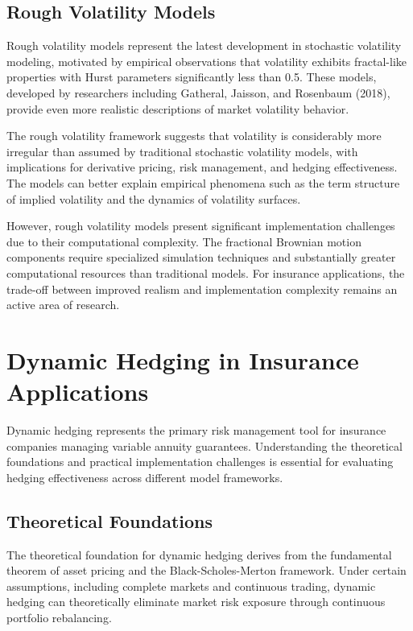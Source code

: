 \documentclass[12pt,a4paper]{report}
\begin{document}
\subsection{Rough Volatility Models}

Rough volatility models represent the latest development in stochastic volatility modeling, motivated by empirical observations that volatility exhibits fractal-like properties with Hurst parameters significantly less than 0.5. These models, developed by researchers including Gatheral, Jaisson, and Rosenbaum (2018), provide even more realistic descriptions of market volatility behavior.

The rough volatility framework suggests that volatility is considerably more irregular than assumed by traditional stochastic volatility models, with implications for derivative pricing, risk management, and hedging effectiveness. The models can better explain empirical phenomena such as the term structure of implied volatility and the dynamics of volatility surfaces.

However, rough volatility models present significant implementation challenges due to their computational complexity. The fractional Brownian motion components require specialized simulation techniques and substantially greater computational resources than traditional models. For insurance applications, the trade-off between improved realism and implementation complexity remains an active area of research.

\section{Dynamic Hedging in Insurance Applications}

Dynamic hedging represents the primary risk management tool for insurance companies managing variable annuity guarantees. Understanding the theoretical foundations and practical implementation challenges is essential for evaluating hedging effectiveness across different model frameworks.

\subsection{Theoretical Foundations}

The theoretical foundation for dynamic hedging derives from the fundamental theorem of asset pricing and the Black-Scholes-Merton framework. Under certain assumptions, including complete markets and continuous trading, dynamic hedging can theoretically eliminate market risk exposure through continuous portfolio rebalancing.
\end{document}
